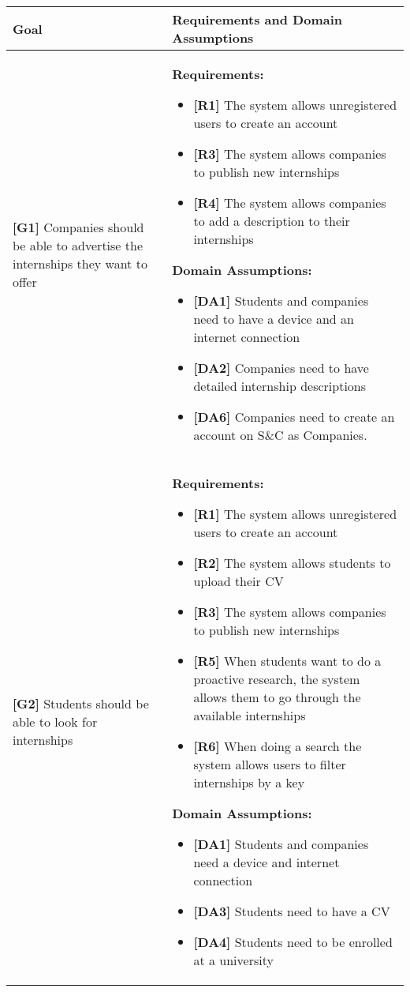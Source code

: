 \begin{longtable}{|p{}|p{}|}
\hline
\textbf{Goal} & \textbf{Requirements and Domain Assumptions} \\
\hline
\textbf{[G1]} Companies should be able to advertise the internships they want to offer 
& 
\textbf{Requirements:}
\begin{itemize}
     \item \textbf{[R1]} The system allows unregistered users to create an account
    \item \textbf{[R3]} The system allows companies to publish new internships
    \item \textbf{[R4]} The system allows companies to add a description to their internships
\end{itemize}
\textbf{Domain Assumptions:}
\begin{itemize}
    \item \textbf{[DA1]} Students and companies need to have a device and an internet connection
    \item \textbf{[DA2]} Companies need to have detailed internship descriptions
    \item \textbf{[DA6]} Companies need to create an account on S\&C as Companies.
\end{itemize} \\
\hline
\textbf{[G2]} Students should be able to look for internships 
& 
\textbf{Requirements:}
\begin{itemize}
     \item \textbf{[R1]} The system allows unregistered users to create an account
    \item \textbf{[R2]} The system allows students to upload their CV
    \item \textbf{[R3]} The system allows companies to publish new internships
    \item \textbf{[R5]} When students want to do a proactive research, the system allows them to go through the available internships
    \item \textbf{[R6]} When doing a search the system allows users to filter internships by a key
\end{itemize}
\textbf{Domain Assumptions:}
\begin{itemize}
    \item \textbf{[DA1]} Students and companies need a device and internet connection
    \item \textbf{[DA3]} Students need to have a CV
     \item \textbf{[DA4]} Students need to be enrolled at a university

\end{itemize}
\end{longtable}
